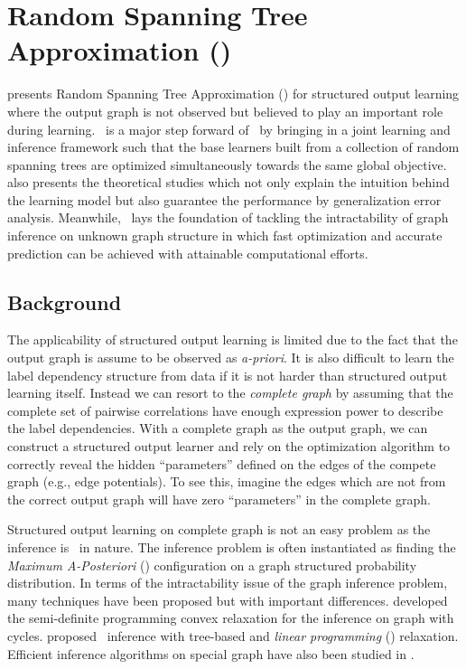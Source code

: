 {%
%
\section{Random Spanning Tree Approximation (\rta)}\label{sc_su14c}

 presents Random Spanning Tree Approximation (\rta) for structured output learning where the output graph is not observed but believed to play an important role during learning.
\rta\ is a major step forward of \mam\ by bringing in a joint learning and inference framework such that the base learners built from a collection of random spanning trees are optimized simultaneously towards the same global objective.
 also presents the theoretical studies which not only explain the intuition behind the learning model but also guarantee the performance by generalization error analysis.
Meanwhile, \rta\ lays the foundation of tackling the intractability of graph inference on unknown graph structure in which fast optimization and accurate prediction can be achieved with attainable computational efforts.



%
%
\subsection{Background}

The applicability of structured output learning is limited due to the fact that the output graph is assume to be observed as \textit{a-priori}.
It is also difficult to learn the label dependency structure from data \citep{Chickering94learning} if it is not harder than structured output learning itself.
Instead we can resort to the \textit{complete graph} by assuming that the complete set of pairwise correlations have enough expression power to describe the label dependencies.
With a complete graph as the output graph, we can construct a structured output learner and rely on the optimization algorithm to correctly reveal the hidden ``parameters'' defined on the edges of the compete graph (e.g., edge potentials).
To see this, imagine the edges which are not from the correct output graph will have zero ``parameters'' in the complete graph.

Structured output learning on complete graph is not an easy problem as the inference is \nphard\ in nature.
The inference problem is often instantiated as finding the \textit{Maximum A-Posteriori} (\map) configuration on a graph structured probability distribution.
In terms of the intractability issue of the graph inference problem, many techniques have been proposed but with important differences.
\citet{Jordan04semiefinite} developed the semi-definite programming convex relaxation for the inference on graph with cycles.
\citet{Wainwright05map} proposed \map\ inference with tree-based and \textit{linear programming} (\lp) relaxation.
Efficient inference algorithms on special graph have also been studied in \citep{Globerson07approximate}.

}
